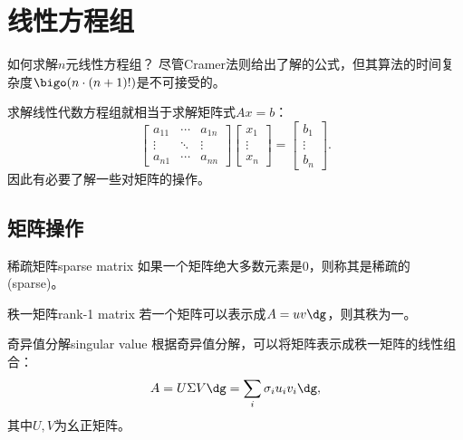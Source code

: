 \chapter{线性方程组}

如何求解$n$元线性方程组？
尽管Cramer法则给出了解的公式，但其算法的时间复杂度$\bigo(n\cdot(n+1)!)$是不可接受的。

\iffalse
求解线性代数方程组就相当于求解矩阵式$Ax=b$：
\begin{equation}
    \begin{bmatrix}
        a_{11}&\cdots&a_{1n}\\
        \vdots&\ddots&\vdots\\
        a_{n1}&\cdots&a_{nn}
    \end{bmatrix}\begin{bmatrix}
        x_1\\\vdots\\x_n
    \end{bmatrix}=\begin{bmatrix}
        b_1\\\vdots\\b_n
    \end{bmatrix}.
\end{equation}
因此有必要了解一些对矩阵的操作。

\section{矩阵操作}

\begin{definition}
    {稀疏矩阵}{sparse matrix}
    如果一个矩阵绝大多数元素是0，则称其是稀疏的(sparse)。
\end{definition}

\begin{definition}
    {秩一矩阵}{rank-1 matrix}
    若一个矩阵可以表示成$A=uv\dg$，则其秩为一。
\end{definition}

\begin{theorem}
    {奇异值分解}{singular value}
    根据奇异值分解，可以将矩阵表示成秩一矩阵的线性组合：
    \begin{equation}
        A=U\Sigma V\dg=\sum_i\sigma_iu_iv_i\dg,
    \end{equation}
    其中$U,V$为幺正矩阵。
\end{theorem}


